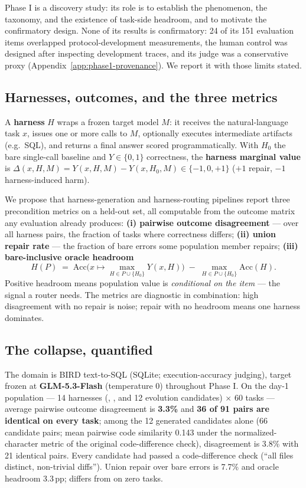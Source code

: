 Phase I is a discovery study: its role is to establish the phenomenon, the
taxonomy, and the existence of task-side headroom, and to motivate the
confirmatory design. None of its results is confirmatory: 24 of its 151
evaluation items overlapped protocol-development measurements, the human
control was designed after inspecting development traces, and its judge was
a conservative proxy (Appendix~\ref{app:phase1-provenance}). We report it
with those limits stated.

\subsection{Harnesses, outcomes, and the three metrics}\label{sec:metrics}
A \textbf{harness} $H$ wraps a frozen target model $M$: it receives the
natural-language task $x$, issues one or more calls to $M$, optionally
executes intermediate artifacts (e.g.\ SQL), and returns a final answer
scored programmatically. With $H_0$ the bare single-call baseline and
$Y \in \{0,1\}$ correctness, the \textbf{harness marginal value} is
$\Delta(x,H,M) = Y(x,H,M) - Y(x,H_0,M) \in \{-1,0,+1\}$
($+1$ repair, $-1$ harness-induced harm).

We propose that harness-generation and
harness-routing pipelines report three precondition metrics on a held-out
set, all computable from the outcome matrix any evaluation already produces:
\textbf{(i) pairwise outcome disagreement} --- over all harness pairs, the
fraction of tasks where correctness differs; \textbf{(ii) union repair
rate} --- the fraction of bare errors some population member repairs;
\textbf{(iii) bare-inclusive oracle headroom}
\[
H(P) \;=\; \mathrm{Acc}\big(x \mapsto \max_{H \in P \cup \{H_0\}} Y(x,H)\big)
\;-\; \max_{H \in P \cup \{H_0\}} \mathrm{Acc}(H).
\]
Positive headroom means population value is \emph{conditional on the item} ---
the signal a router needs. The metrics are diagnostic in combination: high
disagreement with no repair is noise; repair with no headroom means one
harness dominates.

\subsection{The collapse, quantified}\label{sec:collapse}
The domain is BIRD text-to-SQL (SQLite; execution-accuracy judging), target
frozen at \textbf{GLM-5.3-Flash} (temperature 0) throughout Phase I. On the
day-1 population --- 14 harnesses (\bare, \react, and 12 evolution
candidates) $\times$ 60 tasks --- average pairwise outcome disagreement is
\textbf{3.3\%} and \textbf{36 of 91 pairs are identical on every task};
among the 12 generated candidates alone (66 candidate pairs; mean pairwise
code similarity 0.143 under the normalized-character metric of the original
code-difference check), disagreement is 3.8\% with 21 identical pairs.
Every candidate had passed a code-difference check (``all files distinct,
non-trivial diffs''). Union repair over bare errors is 7.7\% and oracle
headroom 3.3\,pp; \react{} differs from \bare{} on zero tasks.

